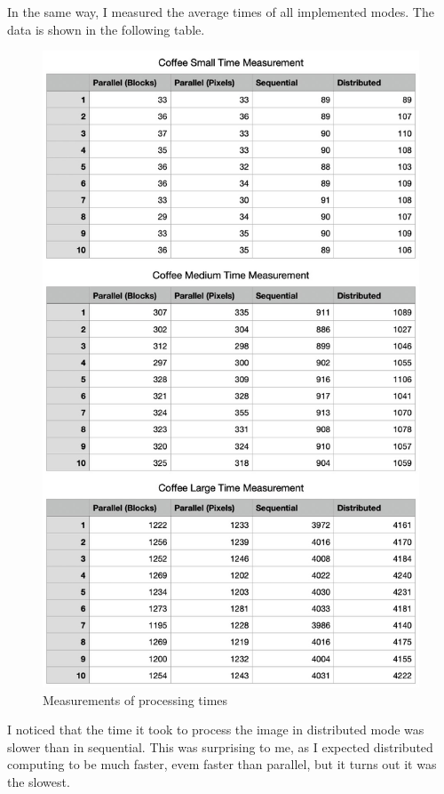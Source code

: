 \documentclass{article}
\begin{document}
\begin{multicols}{2}
    In the same way, I measured the average times of all implemented modes. The data is shown in the following table.

    \begin{figure}[H]
        \centering
        \includegraphics[width=\linewidth]{img/measurements.jpg}
        \caption{Measurements of processing times}
        \label{fig:modes}
    \end{figure}

    I noticed that the time it took to process the image in distributed mode was slower than in sequential. This was surprising to me, as I expected distributed computing to be much faster, evem faster than parallel, but it turns out it was the slowest.


\end{multicols}
\end{document}
